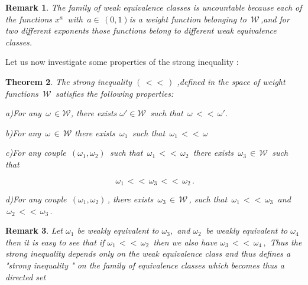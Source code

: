 \documentclass[12pt,a4paper]{amsart}
\newtheorem{theorem}{Theorem}[section]
\newtheorem{remark}[theorem]{Remark}
\begin{document}
\begin{remark}
The family of weak equivalence classes is uncountable 
because each of the functions $x^a\,$ with $\,a\in\,(0,1)$is a weight function belonging to $\,\mathcal{W}\,$,and for two different exponents those functions belong to different weak equivalence classes.

\end{remark}

Let us now investigate some properties of the strong inequality :

\begin{theorem}
The strong inequality $(\,<<\,) $ ,defined in the space of weight functions
 $\,\mathcal{W}\,$ satisfies the following properties:
 
 a)For any $\,\omega\,\in\mathcal{W}$, there exists  $\omega'\in\mathcal{W}\, $ such that $\,\omega\,<<\,\omega'$.
 
 b)For any $\,\omega\,\in\,\mathcal{W}$ there exists 
 $\,\omega_1\,$ such that $\,\omega_1\,<<\,\omega\,$
 
 c)For any couple $\,(\omega_1,\omega_2)\,$
 such that $\,\omega_1 \,<<\,\omega_2\,$ there exists 
 $\,\omega_3\,\in \,\mathcal{W}\,$ such that 
 
 
 $$\,\omega_1\,<<\,\omega_3\,<<\,\omega_2\,.$$
 
 d)For any couple $\,(\omega_1,\omega_2)\,$, there exists
 $\,\omega_3\,\in \,\mathcal{W}\,$, such that 
 $\,\omega_1\,<<\,\omega_3\,$ 
 and $\,\omega_2\,<<\,\omega_3\,.$
 \end{theorem}

\begin{remark}
Let $\omega_1$ be weakly  equivalent to $\omega_3,$ and 
$\omega_2 \,$ be weakly equivalent to $\omega_4\,$ then it is easy to see that if $\omega_1\,<<\,\omega_2
\,$ then we also have $\omega_3\,<<\,\omega_4\,,$
Thus the strong inequality depends only on the weak equivalence class and thus defines a "strong inequality "
on the family of equivalence classes which becomes thus a directed set
\end{remark}
\end{document}
